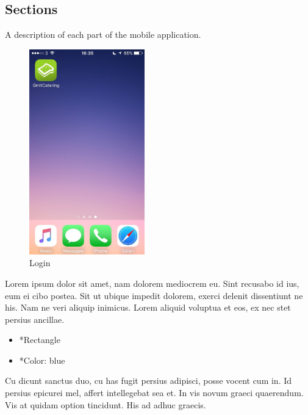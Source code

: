 \subsection{Sections}
A description of each part of the mobile application.
\begin{minipage}{5cm}
	\begin{figure}[H]
		\includegraphics[width=5cm]{img/mobile-app/screen-shots/IMG_2903.jpg}
		\caption{Login}
	\end{figure}
\end{minipage} \hfill
\begin{minipage}{0.55\textwidth}
	Lorem ipsum dolor sit amet, nam dolorem mediocrem eu. Sint recusabo id ius, eum ei cibo postea. Sit ut ubique impedit dolorem, exerci delenit dissentiunt ne his. Nam ne veri aliquip inimicus. Lorem aliquid voluptua et eos, ex nec stet persius ancillae.
	\begin{itemize}
		\item *Rectangle
		\item *Color: blue
	\end{itemize}
	Cu dicunt sanctus duo, cu has fugit persius adipisci, posse vocent cum in. Id persius epicurei mel, affert intellegebat sea et. In vis novum graeci quaerendum. Vis at quidam option tincidunt. His ad adhuc graecis.
\end{minipage}

